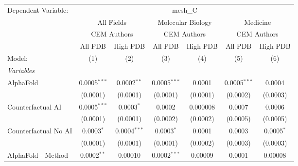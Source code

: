\begingroup
\centering
\begin{tabular}{lcccccc}
   \tabularnewline \midrule \midrule
   Dependent Variable: & \multicolumn{6}{c}{mesh\_C}\\
 & \multicolumn{2}{c}{All Fields} & \multicolumn{2}{c}{Molecular Biology} & \multicolumn{2}{c}{Medicine} \\
\cmidrule(lr){2-3} \cmidrule(lr){4-5} \cmidrule(lr){6-7}
 & \multicolumn{2}{c}{CEM Authors} & \multicolumn{2}{c}{CEM Authors} & \multicolumn{2}{c}{CEM Authors} \\
\cmidrule(lr){2-3} \cmidrule(lr){4-5} \cmidrule(lr){6-7}
 & \multicolumn{1}{c}{All PDB} & \multicolumn{1}{c}{High PDB} & \multicolumn{1}{c}{All PDB} & \multicolumn{1}{c}{High PDB} & \multicolumn{1}{c}{All PDB} & \multicolumn{1}{c}{High PDB} \\
\cmidrule(lr){2-2} \cmidrule(lr){3-3} \cmidrule(lr){4-4} \cmidrule(lr){5-5} \cmidrule(lr){6-6} \cmidrule(lr){7-7}
   Model:                                                     & (1)            & (2)            & (3)            & (4)          & (5)            & (6)\\  
   \midrule
   \emph{Variables}\\
   AlphaFold                                                  & 0.0005$^{***}$ & 0.0002$^{**}$  & 0.0005$^{***}$ & 0.0001       & 0.0005$^{***}$ & 0.0004\\   
                                                              & (0.0001)       & (0.0001)       & (0.0001)       & (0.0001)     & (0.0002)       & (0.0003)\\   
   Counterfactual AI                                          & 0.0005$^{***}$ & 0.0003$^{*}$   & 0.0002         & 0.000008     & 0.0007         & 0.0006\\   
                                                              & (0.0001)       & (0.0001)       & (0.0002)       & (0.0002)     & (0.0005)       & (0.0005)\\   
   Counterfactual No AI                                       & 0.0003$^{*}$   & 0.0004$^{***}$ & 0.0003$^{*}$   & 0.0001       & 0.0003         & 0.0005$^{*}$\\   
                                                              & (0.0001)       & (0.0001)       & (0.0001)       & (0.0002)     & (0.0003)       & (0.0003)\\   
   AlphaFold - Method                                         & 0.0002$^{**}$  & 0.00010        & 0.0002$^{***}$ & 0.00009      & 0.0001         & 0.00008\\   

\end{tabular}
